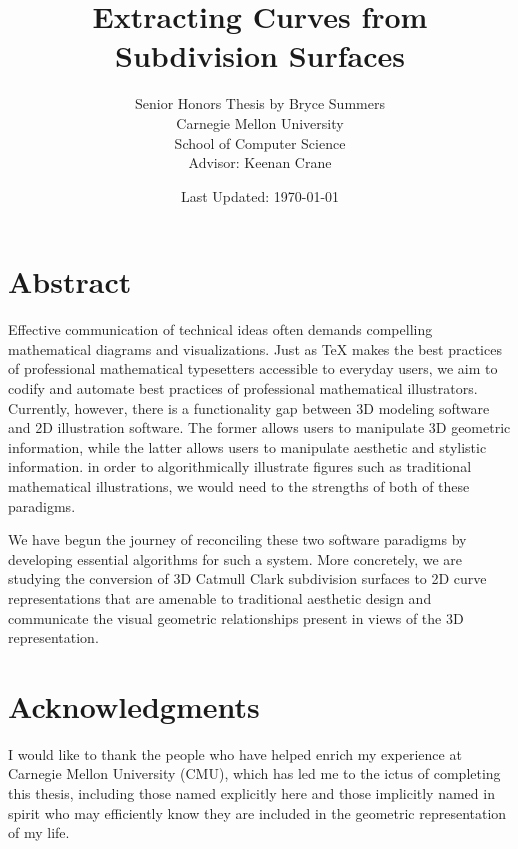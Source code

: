 \documentclass[12pt, letterpaper]{article}
\begin{document}
\doublespacing

\title{\color{blue}Extracting Curves from Subdivision Surfaces}
\author{Senior Honors Thesis by Bryce Summers \\
Carnegie Mellon University\\
School of Computer Science\\
Advisor: Keenan Crane}
\date{\color{red}Last Updated: \today}
\maketitle



\newpage

\section*{Abstract}

	Effective communication of technical ideas often demands compelling mathematical diagrams and visualizations. 
	Just as TeX makes the best practices of professional mathematical typesetters accessible to everyday users,
	we aim to codify and automate best practices of professional mathematical illustrators.
	Currently, however, there is a functionality gap between 3D modeling software and 2D illustration software.
	The former allows users to manipulate 3D geometric information, while the latter allows users to manipulate aesthetic and stylistic information.
	in order to algorithmically illustrate figures such as traditional mathematical illustrations, we would need to the strengths of both of these paradigms.

	We have begun the journey of reconciling these two software paradigms by developing essential algorithms for such a system. 
	More concretely, we are studying the conversion of 3D Catmull Clark subdivision surfaces to 2D curve representations that are amenable to
	traditional aesthetic design and communicate the visual geometric relationships present in views of the 3D representation.

\newpage

\section*{Acknowledgments}
\singlespacing

I would like to thank the people who have helped enrich my experience at Carnegie Mellon University (CMU),
which has led me to the ictus of completing this thesis, including those named explicitly here  and
those implicitly named in spirit who may efficiently know they are included in the geometric representation of my life.
\end{document}

